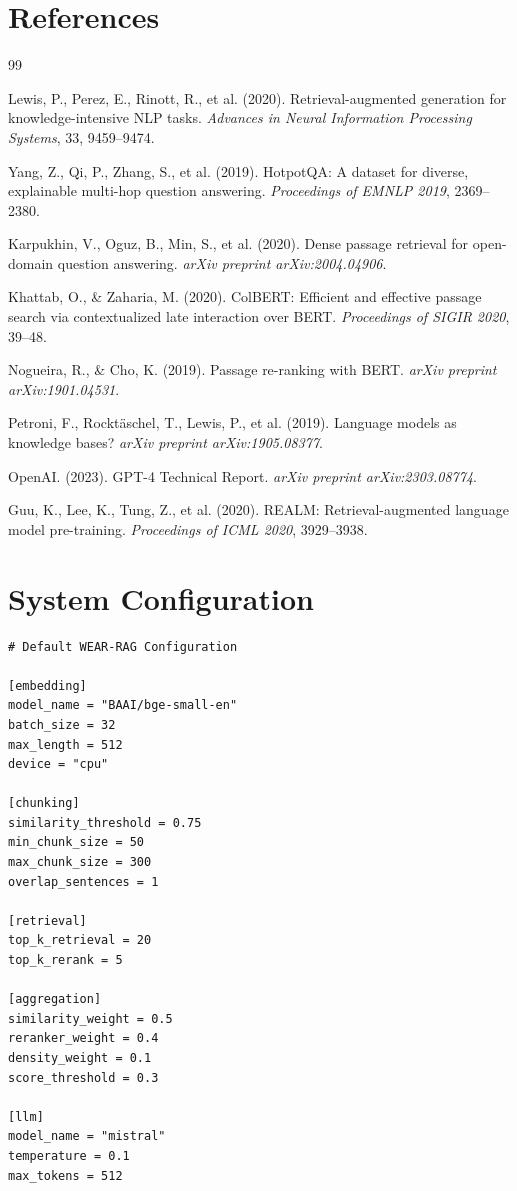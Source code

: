 \documentclass[twocolumn,11pt]{article}
\begin{document}
\section*{References}

\begin{thebibliography}{99}

 Lewis, P., Perez, E., Rinott, R., et al. (2020). Retrieval-augmented generation for knowledge-intensive NLP tasks. \textit{Advances in Neural Information Processing Systems}, 33, 9459--9474.

 Yang, Z., Qi, P., Zhang, S., et al. (2019). HotpotQA: A dataset for diverse, explainable multi-hop question answering. \textit{Proceedings of EMNLP 2019}, 2369--2380.

 Karpukhin, V., Oguz, B., Min, S., et al. (2020). Dense passage retrieval for open-domain question answering. \textit{arXiv preprint arXiv:2004.04906}.

 Khattab, O., \& Zaharia, M. (2020). ColBERT: Efficient and effective passage search via contextualized late interaction over BERT. \textit{Proceedings of SIGIR 2020}, 39--48.

 Nogueira, R., \& Cho, K. (2019). Passage re-ranking with BERT. \textit{arXiv preprint arXiv:1901.04531}.

 Petroni, F., Rocktäschel, T., Lewis, P., et al. (2019). Language models as knowledge bases? \textit{arXiv preprint arXiv:1905.08377}.

 OpenAI. (2023). GPT-4 Technical Report. \textit{arXiv preprint arXiv:2303.08774}.

 Guu, K., Lee, K., Tung, Z., et al. (2020). REALM: Retrieval-augmented language model pre-training. \textit{Proceedings of ICML 2020}, 3929--3938.

\end{thebibliography}

\appendix

\section{System Configuration}

\begin{verbatim}
# Default WEAR-RAG Configuration

[embedding]
model_name = "BAAI/bge-small-en"
batch_size = 32
max_length = 512
device = "cpu"

[chunking]
similarity_threshold = 0.75
min_chunk_size = 50
max_chunk_size = 300
overlap_sentences = 1

[retrieval]
top_k_retrieval = 20
top_k_rerank = 5

[aggregation]
similarity_weight = 0.5
reranker_weight = 0.4
density_weight = 0.1
score_threshold = 0.3

[llm]
model_name = "mistral"
temperature = 0.1
max_tokens = 512
\end{verbatim}
\end{document}
